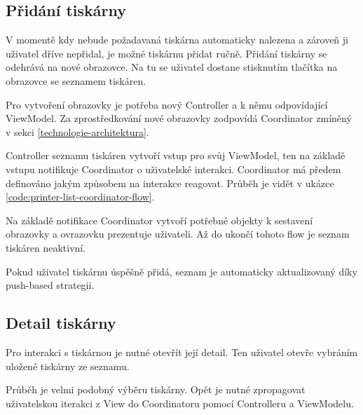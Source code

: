 
\subsection{Přidání tiskárny}

V momentě kdy nebude požadavaná tiskárna automaticky nalezena a zároveň ji uživatel dříve nepřidal, je možné tiskárnu přidat ručně.
Přidání tiskárny se odehrává na nové obrazovce.
Na tu se uživatel dostane stisknutím tlačítka \uv{+} na obrazovce se seznamem tiskáren.

Pro vytvoření obrazovky je potřeba nový Controller a k němu odpovídající ViewModel.
Za zprostředkování nové obrazovky zodpovídá Coordinator zmíněný v sekci \ref{technologie-architektura}.

Controller seznamu tiskáren vytvoří vstup pro svůj ViewModel, ten na základě vstupu notifikuje Coordinator o uživatelské interakci.
Coordinator má předem definováno jakým způsobem na interakce reagovat.
Průběh je vidět v ukázce \ref{code:printer-list-coordinator-flow}.

Na základě notifikace Coordinator vytvoří potřebné objekty k sestavení obrazovky a ovrazovku prezentuje uživateli.
Až do ukončí tohoto flow je seznam tiskáren neaktivní.

Pokud uživatel tiskárnu úspěšně přidá, seznam je automaticky aktualizovaný díky push-based strategii.


\subsection{Detail tiskárny}

Pro interakci s tiskárnou je nutné otevřít její detail.
Ten uživatel otevře vybráním uložené tiskárny ze seznamu.

Průběh je velmi podobný výběru tiskárny.
Opět je nutné zpropagovat uživatelskou iterakci z View do Coordinatoru pomocí Controlleru a ViewModelu.